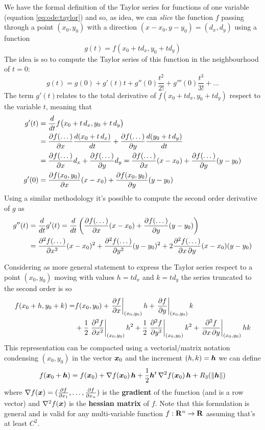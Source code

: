	We have the formal definition of the Taylor series for functions of one variable (equation \ref{eq:ode:taylor}) and so, as idea, we can \textit{slice} the function $f$ passing through a point $(x_0,y_0)$ with a direction $(x-x_0,y-y_0) = (d_x,d_y)$ using a function
	\[ g(t) = f(x_0 + td_x,y_0 + td_y) \]
	The idea is so to compute the Taylor series of this function in the neighbourhood of $t = 0$:
	\[ g(t) = g(0) + g'(t) t + g''(0) \frac{t^2}{2!} + g'''(0) \frac{t^3}{3!} +  \dots \]
	The term $g'(t)$relates to the total derivative of $f(x_0 + t d_x, y_0 + t d_y)$ respect to the variable $t$, meaning that
	\begin{align*}
		g'(t) & = \frac{d}{dt} f\big(x_0 + t\, d_x, y_0 + t\, d_y\big) \\
		& = \frac{\partial f(\dots)}{\partial x} \frac{d(x_0+t\, d_x)}{dt} + \frac{\partial f(\dots)}{\partial y} \frac{d(y_0+t\, d_y)}{dt} \\
		& = \frac{\partial f(\dots)}{\partial x} d_x + \frac{\partial f(\dots)}{\partial y} d_y = \frac{\partial f(\dots)}{\partial x} (x-x_0) + \frac{\partial f(\dots)}{\partial y} (y-y_0) \\
		g'(0) & = \frac{\partial f(x_0,y_0)}{\partial x}(x-x_0) + \frac{\partial f(x_0,y_0)}{\partial y}(y-y_0)
	\end{align*}
	Using a similar methodology it's possible to compute the second order derivative of $g$ as
	\begin{align*}
		g''(t) & = \frac d{dt}g'(t) = \frac{d}{dt} \left( \frac{\partial f(\dots)}{\partial x} (x-x_0) + \frac{\partial f(\dots)}{\partial y} (y-y_0) \right) \\
		& = \frac{\partial^2 f(\dots)}{\partial x^2} (x-x_0)^2 + \frac{\partial^2 f(\dots)}{\partial y^2} (y-y_0)^2 + 2 \frac{\partial^2 f(\dots)}{\partial x \, \partial y} (x-x_0)(y-y_0)
	\end{align*}
	
	Considering as more general statement to express the Taylor series respect to a point $(x_0,y_0)$ moving with values $h = td_x$ and $k = t d_y$ the series truncated to the second order is so
	\begin{equation}
	\begin{split}
		f(x_0 + h, y_0 + k) = & f(x_0,y_0)  + \left. \frac{\partial f}{\partial x}\right|_{(x_0,y_0)} h + \left. \frac{\partial f}{\partial y}\right|_{(x_0,y_0)} k  \\ & + \frac 1 2 \left.  \frac{\partial^2 f}{\partial x^2} \right|_{(x_0,y_0)} h^2 + \frac 1 2 \left.  \frac{\partial^2 f}{\partial y^2} \right|_{(x_0,y_0)} k^2 + \left.  \frac{\partial^2 f}{\partial x \,\partial y} \right|_{(x_0,y_0)} hk
	\end{split}
	\end{equation}
	This representation can be compacted using a vectorial/matrix notation condensing $(x_0,y_0)$ in the vector $\boldsymbol{x}_0$ and the increment $(h,k) = \boldsymbol{h}$ we can define
	\begin{equation}
		f (\boldsymbol{x}_0 + \boldsymbol{h}) = f(\boldsymbol{x}_0) + \nabla f(\boldsymbol{x}_0)\, \boldsymbol{h} + \frac 12 \boldsymbol{h}^t \, \nabla^2 f(\boldsymbol{x}_0)\, \boldsymbol{h} + R_3(\|\boldsymbol{h}\|)
	\end{equation}
	where $\nabla f(\boldsymbol{x}) = (\frac{\partial f}{\partial x_1}, \dots, \frac{\partial f}{\partial x_n})$ is the \textbf{gradient} of the function (and is a row vector) and $\nabla^2f(\boldsymbol{x})$ is the \textbf{hessian matrix} of $f$. Note that this formulation is general and is valid for any multi-variable function $f:\mathbf{R}^n\rightarrow \mathbf{R}$ assuming that's at least $C^2$.
	
